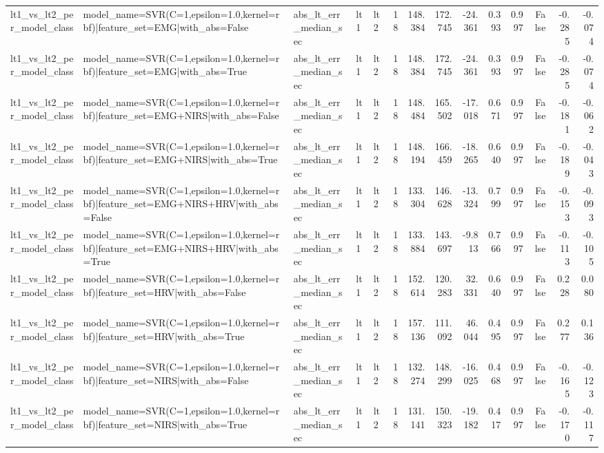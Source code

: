 \begin{table}
\begin{tabular}{lllllrrrrrrrrr}
lt1_vs_lt2_per_model_class & model_name=SVR(C=1,epsilon=1.0,kernel=rbf)|feature_set=EMG|with_abs=False & abs_lt_err_median_sec & lt1 & lt2 & 18 & 148.384 & 172.745 & -24.361 & 0.393 & 0.997 & False & -0.285 & -0.074 \\
lt1_vs_lt2_per_model_class & model_name=SVR(C=1,epsilon=1.0,kernel=rbf)|feature_set=EMG|with_abs=True & abs_lt_err_median_sec & lt1 & lt2 & 18 & 148.384 & 172.745 & -24.361 & 0.393 & 0.997 & False & -0.285 & -0.074 \\
lt1_vs_lt2_per_model_class & model_name=SVR(C=1,epsilon=1.0,kernel=rbf)|feature_set=EMG+NIRS|with_abs=False & abs_lt_err_median_sec & lt1 & lt2 & 18 & 148.484 & 165.502 & -17.018 & 0.671 & 0.997 & False & -0.181 & -0.062 \\
lt1_vs_lt2_per_model_class & model_name=SVR(C=1,epsilon=1.0,kernel=rbf)|feature_set=EMG+NIRS|with_abs=True & abs_lt_err_median_sec & lt1 & lt2 & 18 & 148.194 & 166.459 & -18.265 & 0.640 & 0.997 & False & -0.189 & -0.043 \\
lt1_vs_lt2_per_model_class & model_name=SVR(C=1,epsilon=1.0,kernel=rbf)|feature_set=EMG+NIRS+HRV|with_abs=False & abs_lt_err_median_sec & lt1 & lt2 & 18 & 133.304 & 146.628 & -13.324 & 0.799 & 0.997 & False & -0.153 & -0.093 \\
lt1_vs_lt2_per_model_class & model_name=SVR(C=1,epsilon=1.0,kernel=rbf)|feature_set=EMG+NIRS+HRV|with_abs=True & abs_lt_err_median_sec & lt1 & lt2 & 18 & 133.884 & 143.697 & -9.813 & 0.766 & 0.997 & False & -0.113 & -0.105 \\
lt1_vs_lt2_per_model_class & model_name=SVR(C=1,epsilon=1.0,kernel=rbf)|feature_set=HRV|with_abs=False & abs_lt_err_median_sec & lt1 & lt2 & 18 & 152.614 & 120.283 & 32.331 & 0.640 & 0.997 & False & 0.228 & 0.080 \\
lt1_vs_lt2_per_model_class & model_name=SVR(C=1,epsilon=1.0,kernel=rbf)|feature_set=HRV|with_abs=True & abs_lt_err_median_sec & lt1 & lt2 & 18 & 157.136 & 111.092 & 46.044 & 0.495 & 0.997 & False & 0.277 & 0.136 \\
lt1_vs_lt2_per_model_class & model_name=SVR(C=1,epsilon=1.0,kernel=rbf)|feature_set=NIRS|with_abs=False & abs_lt_err_median_sec & lt1 & lt2 & 18 & 132.274 & 148.299 & -16.025 & 0.468 & 0.997 & False & -0.165 & -0.123 \\
lt1_vs_lt2_per_model_class & model_name=SVR(C=1,epsilon=1.0,kernel=rbf)|feature_set=NIRS|with_abs=True & abs_lt_err_median_sec & lt1 & lt2 & 18 & 131.141 & 150.323 & -19.182 & 0.417 & 0.997 & False & -0.170 & -0.117 \\

\end{tabular}
\end{table}
